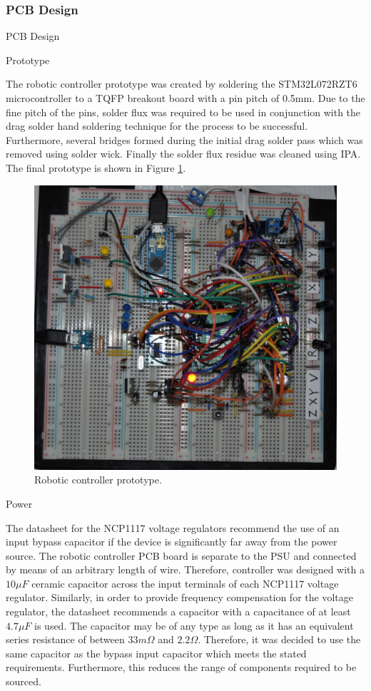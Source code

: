 \subsubsection{PCB Design}

PCB Design

Prototype

The robotic controller prototype was created by soldering the STM32L072RZT6 microcontroller to a TQFP breakout board with a pin pitch of 0.5mm. Due to the fine pitch of the pins, solder flux was required to be used in conjunction with the drag solder hand soldering technique for the process to be successful. Furthermore, several bridges formed during the initial drag solder pass which was removed using solder wick. Finally the solder flux residue was cleaned using IPA. The final prototype is shown in Figure \ref{fig:robotic-controller-prototype}.

\begin{figure}[H]
	\centering
	\includegraphics[width=0.7\linewidth]{figures/robotic-controller-prototype.JPG}
	\caption{Robotic controller prototype.}
	\label{fig:robotic-controller-prototype}
\end{figure}

Power

The datasheet for the NCP1117 voltage regulators recommend the use of an input bypass capacitor if the device is significantly far away from the power source. The robotic controller PCB board is separate to the PSU and connected by means of an arbitrary length of wire. Therefore, controller was designed with a $10\mu F$ ceramic 
capacitor across the input terminals of each NCP1117 voltage regulator. Similarly, in order to provide frequency compensation for the voltage regulator, the datasheet recommends a capacitor with a capacitance of at least $4.7\mu F$ is used. The capacitor may be of any type as long as it has an equivalent series resistance of between $33m\Omega$ and $2.2\Omega$. Therefore, it was decided to use the same capacitor as the bypass input capacitor which meets the stated requirements. Furthermore, this reduces the range of components required to be sourced.

